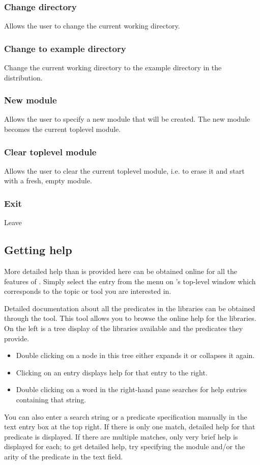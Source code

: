 \subsubsection{Change directory}
Allows the user to change the current working directory.

\subsubsection{Change to example directory}
Change the current working directory to the example directory in the
{\eclipse} distribution.

\subsubsection{New module}
Allows the user to specify a new module that will be created.  The new
module becomes the current toplevel module.  


\subsubsection{Clear toplevel module} 
Allows the user to clear the current toplevel module, i.e. to erase it and
start with a fresh, empty module.

\subsubsection{Exit}
 Leave {\eclipse}


\subsection{Getting help}

More detailed help than is provided here can be obtained online for
all the features of {\tkeclipse}.  Simply select the entry from the
 menu on {\tkeclipse}'s top-level window which
corresponds to the topic or tool you are interested in.

Detailed documentation about all the predicates in the
{\eclipse} libraries can be obtained through the
 tool.
This tool allows you to browse the online help for the {\eclipse}
libraries.  On the left is a tree display of the libraries available
and the predicates they provide.
\begin{itemize}
\item Double clicking on a node in this tree either expands it or
collapses it again.
\item Clicking on an entry displays help for that entry to the right.
\item Double clicking on a word in the right-hand pane searches for
help entries containing that string.
\end{itemize}
You can also enter a search string or a predicate specification
manually in the text entry box at the top right.  If there is only one
match, detailed help for that predicate is displayed.  If there are
multiple matches, only very brief help is displayed for each; to get
detailed help, try specifying the module and/or the arity of the
predicate in the text field.

